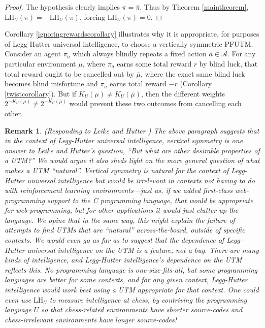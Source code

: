 \documentclass{article}
\newtheorem{remark}[theorem]{Remark}
\def\LH{\textrm{LH}}
\begin{document}
\begin{proof}
    The hypothesis clearly implies $\pi=\overline\pi$. Thus by Theorem
    \ref{maintheorem}, $\LH_U(\pi)=-\LH_U(\pi)$,
    forcing $\LH_U(\pi)=0$.
\end{proof}

Corollary \ref{ignoringrewardscorollary} illustrates why it is appropriate, for
purposes of Legg-Hutter universal intelligence, to choose a vertically symmetric PFUTM.
Consider an agent $\pi_a$
which always blindly repeats a fixed action $a\in\mathcal A$.
For any particular environment $\mu$,
where $\pi_a$ earns some total reward $r$ by blind luck,
that total reward ought to be cancelled out by $\overline\mu$, where
the exact same blind luck becomes blind misfortune and $\pi_a$ earns total reward
$-r$ (Corollary \ref{twistcorollary}). But if $K_U(\mu)\not=K_U(\overline\mu)$,
then the different weights $2^{-K_U(\mu)}\not=2^{-K_U(\overline\mu)}$ would prevent
these two outcomes from cancelling each other.

\begin{remark}
\label{leikeresponse}
\emph{(Responding to Leike and Hutter \cite{leike2015bad})
The above paragraph suggests that in the context of Legg-Hutter universal intelligence,
vertical symmetry is one answer to Leike and Hutter's question,
``But what are other desirable properties of a UTM?'' We would argue it also sheds light
on the more general question of what makes a UTM ``natural''. Vertical symmetry is
natural for the context of Legg-Hutter universal intelligence but would be
irrelevant in contexts not having to do with reinforcement learning environments---just
as, if we added first-class web-programming support to the C programming language,
that would be appropriate for web-programming, but for other applications it would just
clutter up the language. We opine that in the same way, this might explain the failure of
attempts \cite{muller2010stationary} to find UTMs that are ``natural'' across-the-board,
outside of specific contexts. We would even go as far as to suggest that the dependence
of Legg-Hutter universal intelligence on the UTM is a feature, not a bug. There are many
kinds of intelligence, and Legg-Hutter intelligence's dependence on the UTM
reflects this. No programming language is one-size-fits-all, but some programming
languages are better for some contexts, and for any given context, Legg-Hutter intelligence
would work best using a UTM appropriate for that context. One could even use $\LH_U$ to
measure intelligence at chess, by contriving the programming language $U$ so that chess-related
environments have shorter source-codes and chess-irrelevant environments have longer
source-codes!}
\end{remark}
\end{document}
